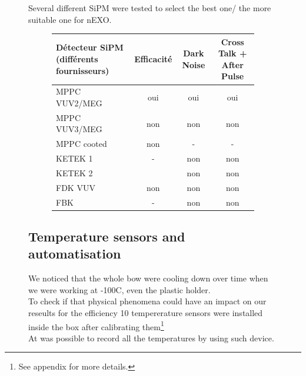\begin{figure}[!hbtp]
  Several different SiPM were tested to select the best one/ the more suitable one for nEXO.
  
  \begin{figure}[!hbtp]
  \centering
  \begin{tabular}{|l|c|c|c|}
  \hline
  D\'etecteur SiPM (diff\'erents fournisseurs) &Efficacit\'e &Dark Noise &Cross Talk + After Pulse\\
  \hline
  MPPC VUV2/MEG &oui &oui &oui\\
  \hline
  MPPC VUV3/MEG &non &non &non\\
  \hline
  MPPC cooted &non &- &-\\
  \hline
  KETEK 1 &- &non &non\\
  \hline
  KETEK 2 & &non &non\\
  \hline
  FDK VUV &non &non &non\\
  \hline
  FBK &- &non &non\\
  \hline
  \end{tabular}
  \end{figure}
  
  \subsection{Temperature sensors and automatisation}
  
  We noticed that the whole bow were cooling down over time when we were working at -100C, even the plastic holder.\\
  To check if that physical phenomena could have an impact on our reseults for the efficiency 10 tempererature sensors were installed inside 
  the box after calibrating them\footnote{See appendix for more details.}\\
  At was possible to record all the temperatures by using such device. 
  

\end{figure}
